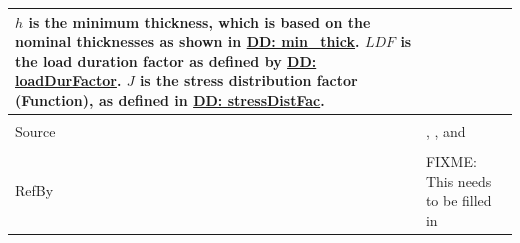 \documentclass[12pt]{article}
\begin{document}
\begin{minipage}{\textwidth}
\begin{tabular}{p{} p{}}
        $h$ is the minimum thickness, which is based on the nominal thicknesses as shown in \hyperref[DD:min.thick]{DD: min\_thick}.
        $LDF$ is the load duration factor as defined by \hyperref[DD:loadDurFactor]{DD: loadDurFactor}.
        $J$ is the stress distribution factor (Function), as defined in \hyperref[DD:stressDistFac]{DD: stressDistFac}.
\\ \midrule \\
Source & \cite{astm2009}, \cite{beasonEtAl1998}, and \cite{campidelli}
\\ \midrule \\
RefBy & FIXME: This needs to be filled in
\\ \bottomrule \end{tabular}
\end{minipage}\\
~\newline
\end{document}

